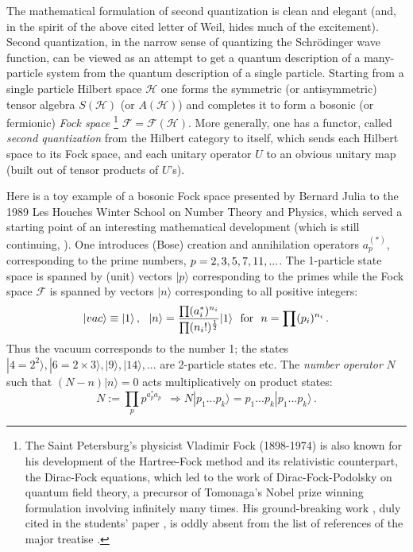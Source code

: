 \documentclass[12pt]{article}
\begin{document}
The mathematical formulation of second quantization is clean and elegant (and, 
in the spirit of the above cited letter of Weil, hides much of the excitement).
 Second quantization, in the narrow sense of quantizing the Schr\"odinger wave 
function, can be viewed as an attempt to get a quantum description of a 
many-particle system from the quantum description of a single particle. Starting
 from a single particle Hilbert space $\mathcal{H}$ one forms the symmetric (or
 antisymmetric) tensor algebra $S(\mathcal{H})$ (or $A(\mathcal{H})$) and 
completes it to form a bosonic (or fermionic) {\it Fock space} \footnote{The 
Saint Petersburg's physicist Vladimir Fock (1898-1974) is also known for his 
development of the Hartree-Fock method and its relativistic counterpart, the 
Dirac-Fock equations, which led to the work of Dirac-Fock-Podolsky on quantum 
field theory, a precursor of Tomonaga's Nobel prize winning formulation 
involving infinitely many times. His ground-breaking work \cite{F32}, duly cited
 in the students' paper \cite{CF09}, is oddly absent from the list of references
 of the major treatise \cite{Sch}.} $\mathcal{F} = \mathcal{F}(\mathcal{H})$. 
More generally, one has a functor, called {\it second quantization} from the
Hilbert category to itself, which sends each Hilbert space to its Fock space, 
and each unitary operator $U$ to an obvious
unitary map (built out of tensor products of $U$'s).

Here is a toy example of a bosonic Fock space presented by Bernard Julia to the 1989 Les Houches Winter School on
Number Theory and Physics, which served a starting point of an interesting
mathematical development \cite{BC} (which is still continuing, \cite{CC}).
One introduces (Bose) creation and annihilation operators $a_p^{(*)}$, corresponding to the prime numbers, $p=2, 3, 5, \\
 7, 11, ...$. The 1-particle state space is spanned by (unit) vectors $|p\rangle$ corresponding to the primes while the Fock 
space $\mathcal{F}$ is spanned by vectors $|n\rangle$ corresponding to all positive integers:
\begin{equation}
\label{JBC}
|vac\rangle\equiv |1\rangle\,, \ \ |n\rangle = \frac{\prod(a_i^*)^{n_i}}{\prod(n_i!)^{\frac{1}{2}}}
|1\rangle \ \ {\rm for} \ \ n = \prod (p_i)^{n_i}\,.
\end{equation}
Thus the vacuum corresponds to the number 1; the states $|4=2^2\rangle, |6=2\times 3\rangle, |9\rangle, |14\rangle, ...$ are 2-particle states etc.
The {\it number operator} $N$ such that $(N-n)|n\rangle = 0$ acts multiplicatively on product states:
\begin{equation}
\label{N}
N:= \prod_p p^{a^*_p a_p} \ \ \Rightarrow N|p_1...p_k\rangle = p_1...p_k |p_1...p_k\rangle\,.
\end{equation}
\end{document}
